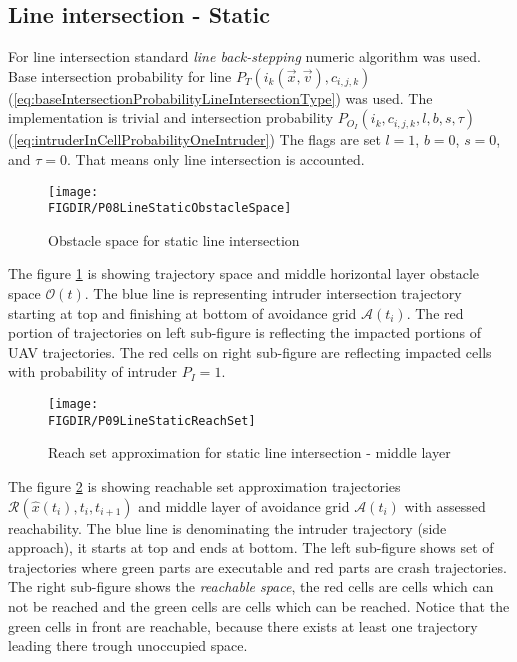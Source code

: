 \subsection{Line intersection - Static}
\noindent For line intersection standard \emph{line back-stepping} numeric algorithm was used. Base intersection probability for line $P_T(i_k(\vec{x},\vec{v}),c_{i,j,k})$  (\ref{eq:baseIntersectionProbabilityLineIntersectionType}) was used. The implementation is trivial and intersection probability $P_{O_I}(i_k,c_{i,j,k},l,b,s,\tau)$ (\ref{eq:intruderInCellProbabilityOneIntruder}) The flags are set $l=1$, $b=0$, $s=0$, and $\tau=0$. That means only line intersection is accounted. 
\begin{figure}[H]
    \centering
    \texttt{[image: \\FIGDIR/P08LineStaticObstacleSpace]}
    \caption{Obstacle space for static line intersection}
    \label{fig:P08LineStaticObstacleSpace}
\end{figure}
\noindent The figure \ref{fig:P08LineStaticObstacleSpace} is showing trajectory space and middle horizontal layer obstacle space $\mathscr{O}(t)$. The blue line is representing intruder intersection trajectory starting at top and finishing at bottom of avoidance grid $\mathscr{A}(t_i)$. The red portion of trajectories on left sub-figure is reflecting the impacted portions of UAV trajectories. The red cells on right sub-figure are reflecting impacted cells with probability of intruder $P_I=1$.
\begin{figure}[H]
    \centering
    \texttt{[image: \\FIGDIR/P09LineStaticReachSet]}
    \caption{Reach set approximation for static line intersection - middle layer}
    \label{fig:P09LineStaticReachSet}
\end{figure}

\noindent The figure \ref{fig:P09LineStaticReachSet} is showing reachable set approximation trajectories $\mathscr{R}(\hat{x}(t_i),t_i,t_{i+1})$ and middle layer of avoidance grid $\mathscr{A}(t_i)$ with assessed reachability. The blue line is denominating the intruder trajectory (side approach), it starts at top and ends at bottom. The left sub-figure shows set of trajectories where green parts are executable and red parts are crash trajectories. The right sub-figure shows the \emph{reachable space}, the red cells are cells which can not be reached and the green cells are cells which can be reached. Notice that the green cells in front are reachable, because there exists at least one trajectory leading there trough unoccupied space. 

